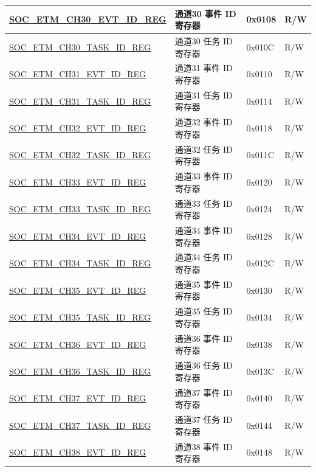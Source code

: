 \begin{longtable}{ | p{6cm} | p{6.2cm} | p{1.3cm} | p{2cm} | }
\hyperref[regdesc:SOCETMCH0EVTIDREG]{SOC\_ETM\_CH30\_EVT\_ID\_REG} & 通道30 事件 ID 寄存器 & 0x0108 & R/W \\ \hline
\hyperref[regdesc:SOCETMCH0TASKIDREG]{SOC\_ETM\_CH30\_TASK\_ID\_REG} & 通道30 任务 ID 寄存器 & 0x010C & R/W \\ \hline
\hyperref[regdesc:SOCETMCH0EVTIDREG]{SOC\_ETM\_CH31\_EVT\_ID\_REG} & 通道31 事件 ID 寄存器 & 0x0110 & R/W \\ \hline
\hyperref[regdesc:SOCETMCH0TASKIDREG]{SOC\_ETM\_CH31\_TASK\_ID\_REG} & 通道31 任务 ID 寄存器 & 0x0114 & R/W \\ \hline
\hyperref[regdesc:SOCETMCH0EVTIDREG]{SOC\_ETM\_CH32\_EVT\_ID\_REG} & 通道32 事件 ID 寄存器 & 0x0118 & R/W \\ \hline
\hyperref[regdesc:SOCETMCH0TASKIDREG]{SOC\_ETM\_CH32\_TASK\_ID\_REG} & 通道32 任务 ID 寄存器 & 0x011C & R/W \\ \hline
\hyperref[regdesc:SOCETMCH0EVTIDREG]{SOC\_ETM\_CH33\_EVT\_ID\_REG} & 通道33 事件 ID 寄存器 & 0x0120 & R/W \\ \hline
\hyperref[regdesc:SOCETMCH0TASKIDREG]{SOC\_ETM\_CH33\_TASK\_ID\_REG} & 通道33 任务 ID 寄存器 & 0x0124 & R/W \\ \hline
\hyperref[regdesc:SOCETMCH0EVTIDREG]{SOC\_ETM\_CH34\_EVT\_ID\_REG} & 通道34 事件 ID 寄存器 & 0x0128 & R/W \\ \hline
\hyperref[regdesc:SOCETMCH0TASKIDREG]{SOC\_ETM\_CH34\_TASK\_ID\_REG} & 通道34 任务 ID 寄存器 & 0x012C & R/W \\ \hline
\hyperref[regdesc:SOCETMCH0EVTIDREG]{SOC\_ETM\_CH35\_EVT\_ID\_REG} & 通道35 事件 ID 寄存器 & 0x0130 & R/W \\ \hline
\hyperref[regdesc:SOCETMCH0TASKIDREG]{SOC\_ETM\_CH35\_TASK\_ID\_REG} & 通道35 任务 ID 寄存器 & 0x0134 & R/W \\ \hline
\hyperref[regdesc:SOCETMCH0EVTIDREG]{SOC\_ETM\_CH36\_EVT\_ID\_REG} & 通道36 事件 ID 寄存器 & 0x0138 & R/W \\ \hline
\hyperref[regdesc:SOCETMCH0TASKIDREG]{SOC\_ETM\_CH36\_TASK\_ID\_REG} & 通道36 任务 ID 寄存器 & 0x013C & R/W \\ \hline
\hyperref[regdesc:SOCETMCH0EVTIDREG]{SOC\_ETM\_CH37\_EVT\_ID\_REG} & 通道37 事件 ID 寄存器 & 0x0140 & R/W \\ \hline
\hyperref[regdesc:SOCETMCH0TASKIDREG]{SOC\_ETM\_CH37\_TASK\_ID\_REG} & 通道37 任务 ID 寄存器 & 0x0144 & R/W \\ \hline
\hyperref[regdesc:SOCETMCH0EVTIDREG]{SOC\_ETM\_CH38\_EVT\_ID\_REG} & 通道38 事件 ID 寄存器 & 0x0148 & R/W \\ \hline

\end{longtable}
